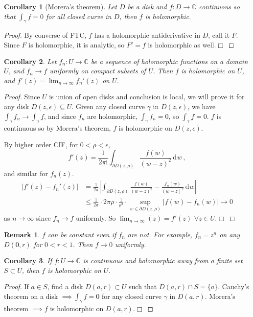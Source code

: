 \documentclass{article}
\theoremstyle{plain}\theoremheaderfont{\normalfont\itshape}\theorembodyfont{\rmfamily}\theoremseparator{.}\newtheorem*{rem}{Remark}\newtheorem*{ex}{Example}\newtheorem*{proof}{Proof}\newtheorem*{altp}{Alternative proof}\newtheorem*{con}{Consequences}\newtheorem*{notn}{Notations}\newtheorem*{cau}{Caution}\newtheorem*{term}{Terminology}\newtheorem*{keyex}{Key example}
\theoremstyle{plain}\theoremheaderfont{\normalfont\bfseries}\theorembodyfont{\rmfamily}\theoremseparator{.}\newtheorem{thm}{Theorem}[section]\newtheorem{lem}[thm]{Lemma}\newtheorem{prop}[thm]{Proposition}\newtheorem*{cor}{Corollary}\newtheorem{defn}[thm]{Definition}\newtheorem{clm}[thm]{Claim}\newtheorem{clminproof}{Claim}\newtheorem{leminproof}{Lemma}\newtheorem{app}{Application}
\theoremstyle{break}\theoremheaderfont{\normalfont\itshape}\theorembodyfont{\rmfamily}\theoremseparator{.\medskip}\newtheorem*{proofskip}{Proof}\newtheorem*{exs}{Examples}\newtheorem*{rems}{Remarks}\newtheorem*{rec}{Recall}\newtheorem*{ppts}{Properties}
\theoremstyle{break}\theoremheaderfont{\normalfont\bfseries}\theorembodyfont{\rmfamily}\theoremseparator{.\medskip}\newtheorem{lemskip}[thm]{Lemma}\newtheorem{defnskip}[thm]{Definition}\newtheorem{propskip}[thm]{Proposition}\newtheorem{thmskip}[thm]{Theorem}
\numberwithin{equation}{section}
\newcommand{\ii}{\mathrm{i}}
\newcommand{\qed}{\hfill\ensuremath{\Box}}
\newcommand{\abs}[1]{\left|#1\right|}
\newcommand{\dd}[2][]{\,\mathrm{d}^{#1} #2}
\newcommand{\CC}{\mathbb{C}}
\begin{document}
    \begin{cor}[Morera's theorem]
        Let \(D\) be a disk and \(f:D\to\CC\) continuous so that \(\int_{\gamma} f=0\) for all closed curve in \(D\), then \(f\) is holomorphic.
    \end{cor}
    \begin{proof}
        By converse of FTC, \(f\) has a holomorphic antiderivative in \(D\), call it \(F\). Since \(F\) is holomorphic, it is analytic, so \(F'=f\) is holomorphic as well.\qed
    \end{proof}
    \begin{cor}
        Let \(f_n:U\to\CC\) be a sequence of holomorphic functions on a domain \(U\), and \(f_n\to f\) uniformly on compact subsets of \(U\). Then \(f\) is holomorphic on \(U\), and \(f'(z)=\lim_{n\to\infty}f_n'(z)\) on \(U\).
    \end{cor}
    \begin{proof}
        Since \(U\) is union of open disks and conclusion is local, we will prove it for any disk \(D(z,\epsilon)\subseteq U\). Given any closed curve \(\gamma\) in \(D(z,\epsilon)\), we have \(\int_{\gamma}f_n\to\int_\gamma f\), and since \(f_n\) are holomorphic, \(\int_\gamma f_n=0\), so \(\int_\gamma f=0\). \(f\) is continuous so by Morera's theorem, \(f\) is holomorphic on \(D(z,\epsilon)\).

        By higher order CIF, for \(0<\rho<\epsilon\),
        \[f'(z)=\frac{1}{2\pi \ii}\int_{\partial D(z,\rho)}\frac{f(w)}{(w-z)^2}\dd{w}\,,\]
        and similar for \(f_n(z)\).
        \begin{align*}
            \abs{f'(z)-f_n'(z)}&=\frac{1}{2\pi}\abs{\int_{\partial D(z,\rho)}\frac{f(w)}{(w-z)^2}-\frac{f_n(w)}{(w-z)^2}\dd{w}}\\
            &\le\frac{1}{2\pi}\cdot 2\pi\rho\cdot\frac{1}{\rho^2}\cdot\sup_{w\in\partial D(z,\rho)}\abs{f(w)-f_n(w)}\to 0
        \end{align*}
        as \(n\to\infty\) since \(f_n\to f\) uniformly. So \(\lim_{n\to\infty}(z)=f'(z)\) \(\forall z\in U\).\qed
    \end{proof}
    \begin{rem}
        \(f\) can be constant even if \(f_n\) are not. For example, \(f_n=z^n\) on any \(D(0,r)\) for \(0<r<1\). Then \(f\to 0\) uniformly.
    \end{rem}
    \begin{cor}
        If \(f:U\to\CC\) is continuous and holomorphic away from a finite set \(S\subset U\), then \(f\) is holomorphic on \(U\).
    \end{cor}
    \begin{proof}
        If \(a\in S\), find a disk \(D(a,r)\subset U\) such that \(D(a,r)\cap S=\{a\}\). Cauchy's theorem on a disk \(\implies\int_\gamma f=0\) for any closed curve \(\gamma\) in \(D(a,r)\). Morera's theorem \(\implies f\) is holomorphic on \(D(a,r)\).\qed
    \end{proof}
    \newpage
\end{document}
